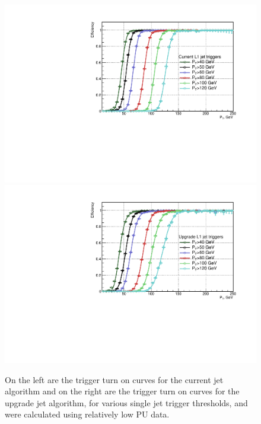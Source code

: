 \begin{figure}[t!]
\begin{center}
  \includegraphics[scale=0.37]{Figures/l1jets//CurrentL1JetTriggers.pdf}
    \includegraphics[scale=0.37]{Figures/l1jets//UpgradeL1JetTriggers.pdf}
\caption{On the left are the trigger turn on curves for the current jet algorithm and on the right are the trigger turn on curves for the upgrade jet algorithm, for various single jet trigger thresholds, and were calculated using relatively low \ac{PU} data.}
\label{JetTO_lowPU}
\end{center}
\end{figure}


